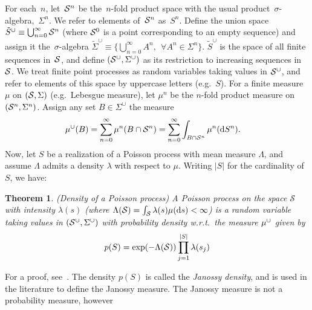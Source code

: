 \documentclass{statsoc}
\newtheorem{thrm}[defn]{Theorem}
\begin{document}
For each~$n$, let~${\mathcal S}^n$ be the~$n$-fold product space with the usual product~$\sigma$-algebra,~$\Sigma^n$. We refer
to elements of~${\mathcal S}^n$ as~$S^n$. %
Define the union space ${\tilde{S}^{\cup} \equiv \bigcup_{n=0}^{\infty} {\mathcal S}^n}$ (where 
${\mathcal S}^0$ is a point corresponding to an empty sequence) %
and assign it 
the~$\sigma$-algebra $\tilde{\Sigma}^{\cup} \equiv \{\bigcup_{n=0}^{\infty} A^n, \ \ \forall A^n \in \Sigma^n\}$. 
$\tilde{S}^{\cup}$ is the space of all finite sequences in~${\mathcal S}$, and define $(\mathcal{S}^{\cup}, \Sigma^{\cup})$ as its restriction to {increasing} sequences
in ${\mathcal S}$. We treat finite point processes as random variables taking values in $\mathcal{S}^{\cup}$, and refer to elements of this space
by uppercase letters (e.g.\ $S$). %
For a finite measure $\mu$ on $({\mathcal S},\Sigma)$ (e.g.\ Lebesgue measure), let $\mu^n$ be the $n$-fold product measure on~$({\mathcal S}^n, \Sigma^n)$.
Assign any set $B \in \Sigma^{\cup}$ the measure
\begin{align}
  \mu^{\cup}(B) &= \sum_{n=0}^{\infty} \mu^n(B \cap {\mathcal S}^n)
         = \sum_{n=0}^{\infty} \int_{B \cap {\mathcal S}^n}  \mu^n(\mathrm{d} S^n). \label{eq:base_measure1}
\end{align}
Now, let $S$ be a realization of a Poisson process with mean measure $\Lambda$, and assume $\Lambda$ %
admits a density $\lambda$ with respect to $\mu$. 
Writing $|S|$ for the cardinality of $S$, we have:
\begin{thrm} \emph{(Density of a Poisson process)} \label{thrm:poiss_density}
  A Poisson process on the space $\mathcal{S}$  with intensity $\lambda(s)$ (where $\Lambda({\mathcal S}) = \int_{{\mathcal S}} \lambda(s) \mu(\mathrm{d} s) < \infty$) is a random variable taking values in $(\mathcal{S}^{\cup}, \Sigma^{\cup})$ with 
probability 
density w.r.t.\ the measure $\mu^{\cup}$
given by 
\vspace{-.05in}
\begin{align}
  p(S) = \exp(-\Lambda({\mathcal S})) \prod_{j=1}^{|S|} \lambda(s_j)  \label{eq:poiss_prob}
\end{align}
\end{thrm}
\vspace{-.02in}
For a proof, see~\cite{DalVer2008a}. The density $p(S)$ is called the \emph{Janossy density}, and is %
used in the literature to define the Janossy measure. The Janossy measure is not a probability measure, however 
\end{document}
